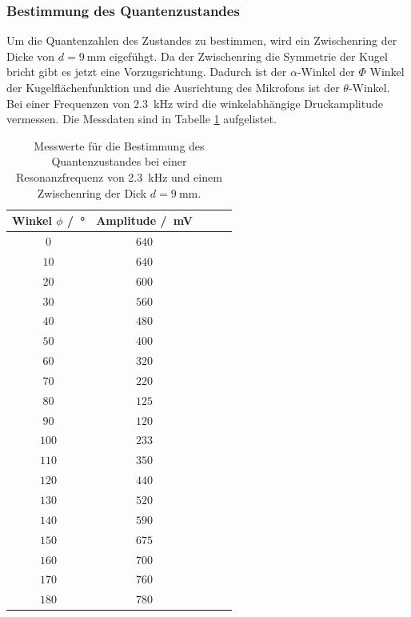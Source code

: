 \subsubsection{Bestimmung des Quantenzustandes}
Um die Quantenzahlen des Zustandes zu bestimmen, wird ein Zwischenring der Dicke von $d=\SI{9}{\milli\meter}$ eigefühgt.
Da der Zwischenring die Symmetrie der Kugel bricht gibt es jetzt eine Vorzugsrichtung. Dadurch ist der $\alpha$-Winkel der $\Phi$ Winkel 
der Kugelflächenfunktion und die Ausrichtung des Mikrofons ist der $\theta$-Winkel.
Bei einer Frequenzen von \SI{2.3}{\kilo\hertz} wird die winkelabhängige Druckamplitude vermessen. Die Messdaten sind in Tabelle
\ref{tab:Messdaten_9mmZwischenring} aufgelistet.
\FloatBarrier
\begin{table}
    \centering
    \caption{Messwerte für die Bestimmung des Quantenzustandes bei einer Resonanzfrequenz von \SI{2.3}{\kilo\hertz} und einem Zwischenring der Dick $d=\SI{9}{\milli\meter}$.}
    \label{tab:Messdaten_9mmZwischenring}
    \begin{tabular}{c c c c c}
        \toprule
        Winkel $\phi$ /\SI{}{\degree}&Amplitude  /\SI{}{\milli\volt}\\
        \midrule
        $\num{0}$  &$\num{640}$ \\
        $\num{10}$ &$\num{640}$ \\
        $\num{20}$ &$\num{600}$ \\
        $\num{30}$ &$\num{560}$ \\
        $\num{40}$ &$\num{480}$ \\
        $\num{50}$ &$\num{400}$\\
        $\num{60}$ &$\num{320}$\\
        $\num{70}$ &$\num{220}$\\
        $\num{80}$ &$\num{125}$\\
        $\num{90}$ &$\num{120}$\\
        $\num{100}$&$\num{233}$\\
        $\num{110}$&$\num{350}$\\
        $\num{120}$&$\num{440}$\\
        $\num{130}$&$\num{520}$\\
        $\num{140}$&$\num{590}$\\
        $\num{150}$&$\num{675}$\\
        $\num{160}$&$\num{700}$\\
        $\num{170}$&$\num{760}$\\
        $\num{180}$&$\num{780}$\\
        \bottomrule
    \end{tabular}
\end{table}
